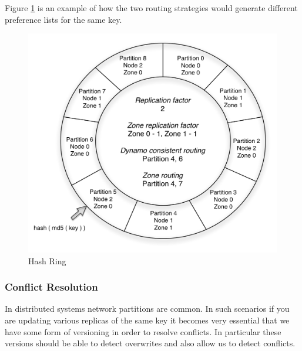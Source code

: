 \documentclass[10pt,twocolumn,preprint,natbib,authoryear]{sigplanconf}
\begin{document}
Figure \ref{hash} is an example of how the two routing strategies would generate different preference lists for the same key.  

\begin{figure}
  \centering
    \includegraphics[scale=0.55]{hash.png}
  \caption{Hash Ring}
  \label{hash}
\end{figure}


\subsubsection {Conflict Resolution } 
\label{sec:system_architecture:system_components:conflict_resolution}

In distributed systems network partitions are common. In such scenarios if you are updating various replicas of the same key it becomes very essential that we have some form of versioning in order to resolve conflicts. In particular these versions should be able to detect overwrites and also allow us to detect conflicts. 
\end{document}

